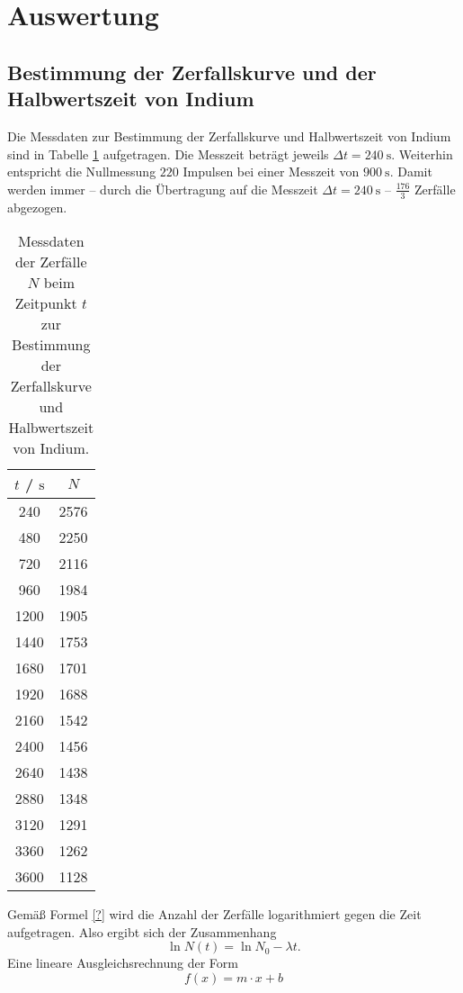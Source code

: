 \section{Auswertung}
\label{sec:Auswertung}

\subsection{Bestimmung der Zerfallskurve und der Halbwertszeit von Indium}
Die Messdaten zur Bestimmung der Zerfallskurve und Halbwertszeit von Indium sind in Tabelle 
\ref{tab:indium} aufgetragen. 
Die Messzeit beträgt jeweils $\Delta t = \SI{240}{\second}$.
Weiterhin entspricht die Nullmessung $220$ Impulsen bei einer Messzeit von $\SI{900}{\second}$.
Damit werden immer -- durch die Übertragung auf die Messzeit $\Delta t = \SI{240}{\second}$ --
$\frac{176}{3}$ Zerfälle abgezogen.
\begin{table}
	\centering
	\caption{Messdaten der Zerfälle $N$ beim Zeitpunkt $t$ zur Bestimmung der Zerfallskurve und Halbwertszeit von Indium.}
	\label{tab:indium}
	\begin{tabular}{cc}
		\toprule
		$t$ / $\si{\second}$ & $N$ \\
		\midrule
		240 & 2576 \\
		480 & 2250 \\
		720 & 2116 \\
		960 & 1984 \\
		1200 & 1905 \\
		1440 & 1753 \\
		1680 & 1701 \\
		1920 & 1688 \\
		2160 & 1542 \\
		2400 & 1456 \\
		2640 & 1438 \\
		2880 & 1348 \\
		3120 & 1291 \\
		3360 & 1262 \\
		3600 & 1128 \\
		\bottomrule
	\end{tabular}
\end{table}
Gemäß Formel \eqref{?} wird die Anzahl der Zerfälle logarithmiert gegen die Zeit aufgetragen.
Also ergibt sich der Zusammenhang
\begin{equation}
	\ln N(t) = \ln N_0 - \lambda t \mathrm{.}
\end{equation}
Eine lineare Ausgleichsrechnung der Form
\begin{equation*}
	f(x) = m \cdot x + b
\end{equation*}
